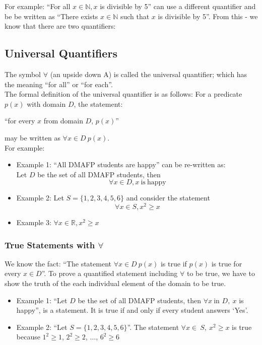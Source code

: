 For example: ``For all $x \in \mathbb{N}, x$ is divisible by 5'' can use a different quantifier and be be written as ``There exists $x \in \mathbb{N}$ such that $x$ is divisible by 5''. From this  - we know that there are two quantifiers:
\subsection{Universal Quantifiers}
The symbol $\forall$ (an upside down A) is called the universal quantifier; which has the meaning ``for all'' or ``for each''.\\

The formal definition of the universal quantifier is as follows: For a predicate $p(x)$ with domain $D$, the statement:
\begin{center}
    ``for every $x$ from domain $D$, $p(x)$''
\end{center}
may be written as $\forall x \in D\  p(x)$.\\

For example:
\begin{itemize}
    \item Example 1: ``All DMAFP students are happy'' can be re-written as:\\
    Let $D$ be the set of all DMAFP students, then
    \[\forall x \in D, x \mathrm{\ is\ happy}\]
    \item Example 2: Let $S = \{1, 2, 3, 4, 5, 6 \}$ and consider the statement
    \[\forall x \in S, x^2 \geq x\]
    \item Example 3: $\forall x \in \mathbb{R}, x^2 \geq x$
\end{itemize}

\subsubsection{True Statements with $\forall$}
We know the fact: ``The statement $\forall x \in D\ p(x)$ is true if $p(x)$ is true for every $x \in D$''. To prove a quantified statement including $\forall$ to be true, we have to show the truth of the each individual element of the domain to be true.
\begin{itemize}
    \item Example 1: ``Let $D$ be the set of all DMAFP students, then $\forall x\ \text{in } D,\  x$ is happy'', is a statement. It is true if and only if every student answers `Yes'. 
    \item Example 2: ``Let $S = \{1, 2, 3, 4, 5, 6 \}$''. The statement $\forall x \in \ S,\ x^2 \geq x$ is true because $1^2 \geq 1$, $2^2 \geq 2$, $\ldots$,  $6^2 \geq 6$
\end{itemize}

